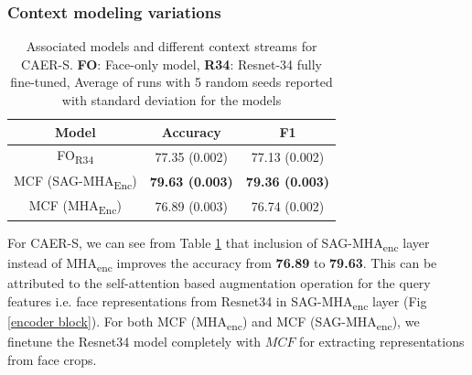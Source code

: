 \subsubsection{Context modeling variations}
\begin{table}[h!]
\centering
\begin{tabular}{|c|c|c|}
\hline
\textbf{Model}  & \textbf{Accuracy} & \textbf{F1}  \\ \hline
FO\textsubscript{R34}          & 77.35 (0.002)     & 77.13 (0.002) \\ \hline
MCF (SAG-MHA\textsubscript{Enc}) & \textbf{79.63 (0.003)}     & \textbf{79.36 (0.003)} \\ \hline
MCF (MHA\textsubscript{Enc})     & 76.89 (0.003)      & 76.74 (0.002) \\ \hline
\end{tabular}
\caption{Associated models and different context streams for CAER-S. \textbf{FO}: Face-only model, \textbf{R34}: Resnet-34 fully fine-tuned, Average of runs with 5 random seeds reported with standard deviation for the models}
\label{ablationCAER-S}
\end{table}

For CAER-S, we can see from Table \ref{ablationCAER-S} that inclusion of SAG-MHA\textsubscript{enc} layer instead of MHA\textsubscript{enc} improves the accuracy from \textbf{76.89} to \textbf{79.63}.  This can be attributed to the self-attention based augmentation operation for the query features i.e. face representations from Resnet34 in SAG-MHA\textsubscript{enc} layer (Fig \ref{encoder block}). For both MCF (MHA\textsubscript{enc}) and MCF (SAG-MHA\textsubscript{enc}), we finetune the Resnet34 model completely with $MCF$ for extracting representations from face crops. 

